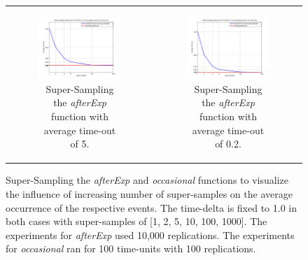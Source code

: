 \begin{figure}
\begin{center}
\begin{tabular}{c c}
		\begin{subfigure}[b]{0.5\textwidth}
			\centering
			\includegraphics[width=.6\textwidth, angle=0]{./../shared/fig/sampling/samplingTest_afterExp_SS_5time.png}
			\caption{Super-Sampling the \textit{afterExp} function with average time-out of 5.}
			\label{fig:sampling_afterExp_ss_5time}
		\end{subfigure}

		&
		
		\begin{subfigure}[b]{0.5\textwidth}
			\centering
			\includegraphics[width=.6\textwidth, angle=0]{./../shared/fig/sampling/samplingTest_afterExp_SS_02time.png}
			\caption{Super-Sampling the \textit{afterExp} function with average time-out of 0.2.}
			\label{fig:sampling_afterExp_ss_02time}
		\end{subfigure}
	\end{tabular}
	
	\caption{Super-Sampling the \textit{afterExp} and \textit{occasional} functions to visualize the influence of increasing number of super-samples on the average occurrence of the respective events. The time-delta is fixed to 1.0 in both cases with super-samples of [1, 2, 5, 10, 100, 1000]. The experiments for \textit{afterExp} used 10,000 replications. The experiments for \textit{occasional} ran for 100 time-units with 100 replications.} 
	\label{fig:supersampling_tests}
\end{center}
\end{figure}

